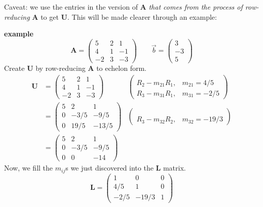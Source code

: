 \documentclass[12pt]{article}
\newcommand{\ve}[1]{\ensuremath{\mathbf{#1}}}
\begin{document}
Caveat: we use the entries in the version of $\ve{A}$ \textit{that comes from the process of row-reducing} $\ve{A}$ to get $\ve{U}$. This will be made clearer through an example:

\textbf{example}
\begin{equation}
\ve{A} = \begin{pmatrix}
  5  & 2 & 1 \\
  4  & 1 & -1 \\
  -2 & 3 & -3
\end{pmatrix}
\qquad 
\vec{b}= \begin{pmatrix}
3 \\ -3 \\ 5
\end{pmatrix} \nonumber
\end{equation}
%
%
Create $\ve{U}$ by row-reducing $\ve{A}$ to echelon form. 
\begin{align}
\ve{U} &= \begin{pmatrix}
  5  & 2 & 1 \\
  4  & 1 & -1 \\
  -2 & 3 & -3
\end{pmatrix} 
&\begin{pmatrix}
 & \\ R_2 - m_{21}R_1, & m_{21} = 4/5 \\ 
      R_3 - m_{31}R_1, & m_{31} = -2/5 \end{pmatrix} \nonumber \\
%
&= \begin{pmatrix}
  5 & 2    & 1 \\
  0 & -3/5 & -9/5 \\
  0 & 19/5 & -13/5
\end{pmatrix} 
&\begin{pmatrix}
 & \\ & \\ R_3 - m_{32}R_2, & m_{32} = -19/3 \end{pmatrix} \nonumber \\                   
%
&= \begin{pmatrix}
  5 & 2    & 1 \\
  0 & -3/5 & -9/5 \\
  0 & 0    & -14
\end{pmatrix} \nonumber
\end{align}
%
Now, we fill the $m_{ij}$s we just discovered into the $\ve{L}$ matrix.
%
\begin{equation}
\ve{L} = \begin{pmatrix}
  1    & 0     & 0 \\
  4/5  & 1     & 0 \\
  -2/5 & -19/3 & 1
\end{pmatrix} \nonumber
\end{equation}
\end{document}
